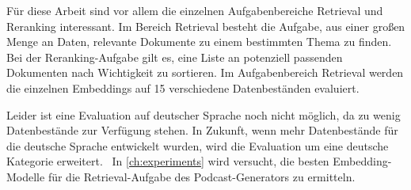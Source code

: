 Für diese Arbeit sind vor allem die einzelnen Aufgabenbereiche Retrieval und Reranking interessant. 
Im Bereich Retrieval besteht die Aufgabe, aus einer großen Menge an Daten, relevante Dokumente zu einem bestimmten Thema zu finden.
Bei der Reranking-Aufgabe gilt es, eine Liste an potenziell passenden Dokumenten nach Wichtigkeit zu sortieren.
Im Aufgabenbereich Retrieval werden die einzelnen Embeddings auf 15 verschiedene Datenbeständen evaluiert.~\cite{muennighoff2023}

Leider ist eine Evaluation auf deutscher Sprache noch nicht möglich, da zu wenig Datenbestände zur Verfügung stehen.
In Zukunft, wenn mehr Datenbestände für die deutsche Sprache entwickelt wurden, wird die Evaluation um eine deutsche Kategorie erweitert.~\cite{muennighoff2023a}
In \autoref{ch:experiments} wird versucht, die besten Embedding-Modelle für die Retrieval-Aufgabe des Podcast-Generators zu ermitteln.


